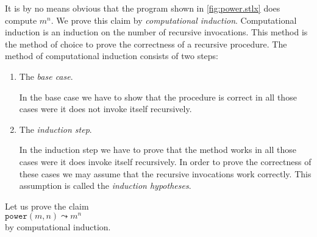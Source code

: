 It is by no means obvious that the program shown in \ref{fig:power.stlx} does compute
$m^n$.  We prove this claim by  \emph{computational induction}.
Computational induction is an induction on the number of recursive invocations.
This method is the method of choice to prove the correctness of a recursive procedure.
The method of computational induction consists of two steps:
\begin{enumerate}
\item The \emph{base case}.

      In the base case we have to show that the procedure is correct in all those cases were it
      does not invoke itself recursively.
\item The \emph{induction step}.

      In the induction step we have to prove that the method works in all those cases were
      it does invoke itself recursively.  In order to prove the correctness of these cases we may
      assume that the recursive invocations work correctly.  This assumption is called the
      \emph{induction hypotheses}.
\end{enumerate}
Let us prove the claim 
\\[0.2cm]
\hspace*{1.3cm}
 $\mathtt{power}(m,n) \leadsto m^n$
\\[0.2cm] 
by computational induction.
